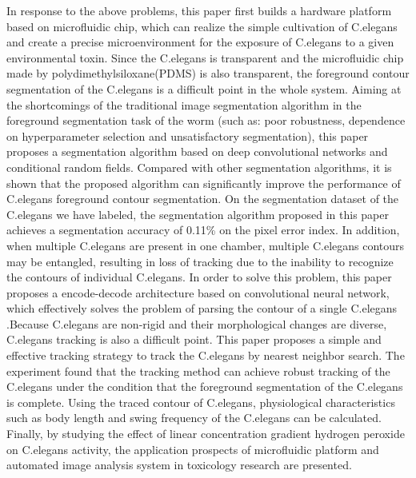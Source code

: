\begin{englishabstract}
In response to the above problems,
 this paper first builds a hardware platform based on microfluidic chip, 
 which can realize the simple cultivation of C.elegans and create 
 a precise microenvironment for the exposure of C.elegans to a
 given environmental toxin.
 Since the C.elegans is transparent and the microfluidic
 chip made by polydimethylsiloxane(PDMS) is also transparent, the foreground contour segmentation 
 of the C.elegans is a difficult point in the whole system.
 Aiming at the shortcomings of the traditional image segmentation algorithm 
in the foreground segmentation task of the worm (such as: poor robustness, 
dependence on hyperparameter selection and unsatisfactory segmentation), 
this paper proposes a segmentation algorithm based on deep convolutional networks and conditional random fields.
Compared with other segmentation algorithms, 
it is shown that the proposed algorithm can significantly improve 
the performance of C.elegans foreground contour segmentation.
On the segmentation dataset of the C.elegans we have labeled, 
the segmentation algorithm proposed in this paper achieves 
a segmentation accuracy of 0.11\% on the pixel error index.
In addition, when multiple C.elegans are present in one chamber, 
multiple C.elegans contours may be entangled, resulting in loss of tracking
 due to the inability to recognize the contours of individual C.elegans.
In order to solve this problem, this paper proposes a 
encode-decode architecture based on convolutional neural network, 
which effectively solves the problem of parsing the contour of a single C.elegans
.Because C.elegans are non-rigid and their morphological changes are diverse, C.elegans tracking is also a difficult point.
This paper proposes a simple and effective tracking strategy to track the
 C.elegans by nearest neighbor search.
 The experiment found that the tracking method can achieve robust
 tracking of the C.elegans under the condition that 
 the foreground segmentation of the C.elegans is complete.
 Using the traced contour of C.elegans, physiological characteristics such as 
 body length and swing frequency of the C.elegans can be calculated.
 Finally, by studying the effect of linear concentration gradient
 hydrogen peroxide on C.elegans activity, the application prospects
 of microfluidic platform and automated image analysis system in toxicology research are presented.
 
\end{englishabstract}

